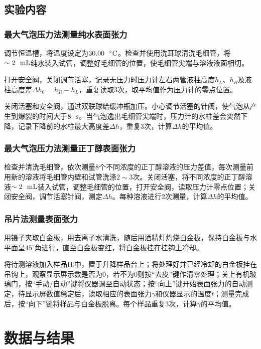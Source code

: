 \documentclass[12pt]{article}
\begin{document}
    	 \subsection{实验内容\citealp{physchemlab}}
			\subsubsection{最大气泡压力法测量纯水表面张力}
	调节恒温槽，将温度设定为$30.00\ \ {\rm ^{\circ}C}$。检查并使用洗耳球清洗毛细管，将$\sim2 \ \ {\rm mL}$纯水装入试管，调整好毛细管的位置，使毛细管尖端与溶液液面相切。\par 
	打开安全阀，关闭调节活塞，记录无压力时压力计左右两管液柱高度$h_{L}$、$h_{R}$及液柱高度差$\Delta h_{0}=h_{R}-h_{L}$，重复读取3次，取平均值作为压力计的零点位置。\par 
	关闭活塞和安全阀，通过双联球给缓冲瓶加压。小心调节活塞的针阀，使气泡从产生到爆裂的时间大于$8\ \ {\rm s}$。当气泡逸出毛细管尖端时，压力计的水柱差会突然下降，记录下降前的水柱最大高度差$\Delta h$，重复3次，计算$\Delta h$的平均值。
			\subsubsection{最大气泡压力法测量正丁醇表面张力}
	检查并清洗毛细管，依次测量8个不同浓度的正丁醇溶液的压力差值，每次测量前用新的溶液将毛细管内壁和试管洗涤$2\sim 3$次。关闭活塞，将不同浓度的正丁醇溶液$\sim2 \ \ {\rm mL}$装入试管，调整毛细管的位置，打开安全阀，读取压力计零点位置；关闭安全阀，调节活塞针阀，测定$\Delta h$。每种溶液进行2次测量，计算$\Delta h$的平均值。
		
			\subsubsection{吊片法测量表面张力}
	用镊子夹取白金板，用去离子水清洗，随后用酒精灯灼烧白金板，保持白金板与水平面呈$45^{\circ}$角进行，直至白金板变红，将白金板挂在挂钩上冷却。\par 
	将待测溶液加入样品皿中，置于升降样品台上；将处理好并已经冷却的白金板挂在吊钩上，观察显示屏示数是否为0，若不为0则按“去皮”键作清零处理；关上有机玻璃门，按“手动/自动”键将仪器调至自动状态；按“向上”键开始表面张力的自动测定，待显示屏数值稳定后，读取相应的表面张力$\gamma$和仪器显示的温度$t$；测量完成后，按“向下”键将样品与白金板脱离。每个样品重复3次，计算$\gamma$的平均值。

\vbox{}
 \section{数据与结果}
\end{document}
